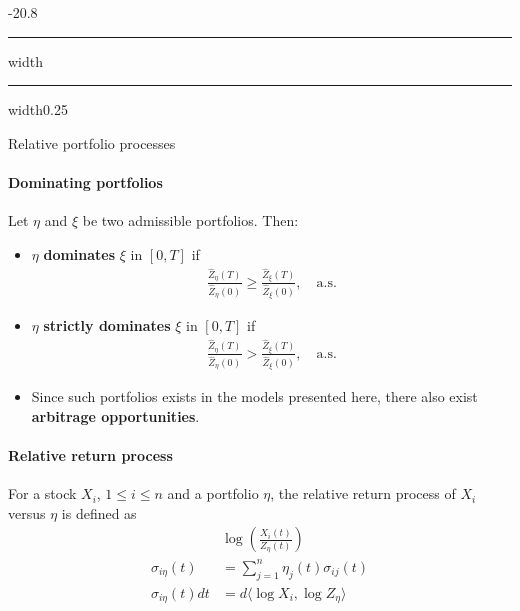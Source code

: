 \documentclass[a4paper,landscape,8pt,fleqn]{scrartcl}
\makeatletter
\renewcommand{\emph}[1]{\textbf{#1}}
\renewcommand{\subsection}{\@startsection{subsection}{1}{0mm}%
{-2\baselineskip}{0.8\baselineskip}%
{\hrule depth 0.2pt width\columnwidth\hrule depth0.75pt
width0.25\columnwidth\vspace*{1.2em}\large\bfseries}}
\makeatother
\begin{document}
\begin{multicols*}{3}



\subsection{Relative portfolio processes}

\paragraph{Dominating portfolios}

Let $\eta$ and $\xi$ be two admissible portfolios. Then:

\begin{itemize}
\item $\eta$ \emph{dominates} $\xi$ in $[0,T]$ if
\begin{align*}
\frac{\hat Z_\eta(T)}{\hat Z_\eta(0)} \geq \frac{\hat Z_\xi(T)}{\hat Z_\xi(0)}, \quad \text{a.s.}
\end{align*}
\item $\eta$ \emph{strictly dominates} $\xi$ in $[0,T]$ if
\begin{align*}
\frac{\hat Z_\eta(T)}{\hat Z_\eta(0)} > \frac{\hat Z_\xi(T)}{\hat Z_\xi(0)}, \quad \text{a.s.}
\end{align*}
\item Since such portfolios exists in the models presented here, there also exist \emph{arbitrage opportunities}.
\end{itemize}

\paragraph{Relative return process}

For a stock $X_i$, $1 \leq i \leq n$ and a portfolio $\eta$, the relative return process of $X_i$ versus $\eta$ is defined as
\begin{align*}
& \log \left( \frac{X_i(t)}{Z_\eta(t)} \right) \\
\sigma_{i \eta}(t) &= \sum_{j=1}^n \eta_j(t) \sigma_{i j}(t) \\
\sigma_{i \eta}(t) dt &= d \langle \log X_i, \log Z_\eta \rangle
\end{align*}


\end{multicols*}
\end{document}
